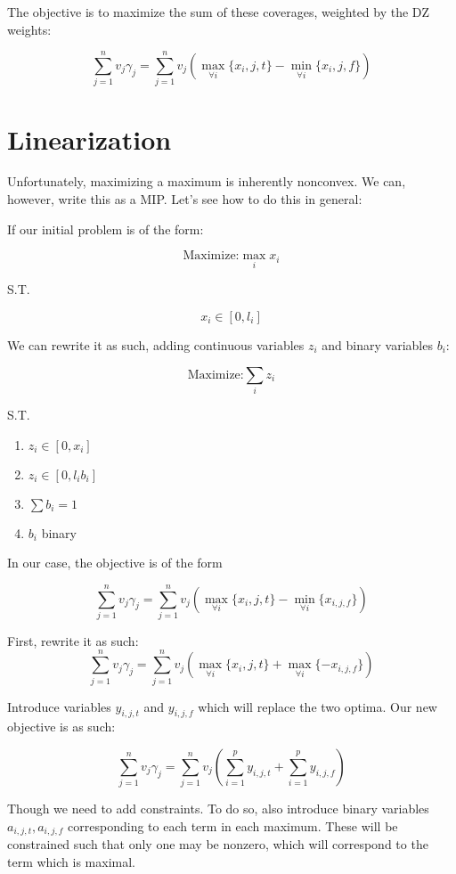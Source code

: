 \documentclass[a4paper]{article}
\begin{document}
The objective is to maximize the sum of these coverages, weighted by the DZ weights:

$$
\sum_{j=1}^n v_j \gamma_j = \sum_{j=1}^n v_j(\max_{\forall i}\{x_i,j,t\} - \min_{\forall i}\{x_i,j,f\})
$$

\section{Linearization}

Unfortunately, maximizing a maximum is inherently nonconvex. We can, however, write this as a MIP. Let's see how to do this in general:

If our initial problem is of the form:

$$
\textrm{Maximize:} \max_{i} x_i
$$

S.T.

$$
x_i \in [0, l_i]
$$

We can rewrite it as such, adding continuous variables $z_i$ and binary variables $b_i$:

$$
\textrm{Maximize:} \sum_{i} z_i
$$

S.T.

\begin{enumerate}
    \item $z_i \in [0, x_i]$
    \item $z_i \in [0, l_i b_i]$
    \item $\sum b_i = 1$
    \item $b_i$ binary
\end{enumerate}

In our case, the objective is of the form 

$$
\sum_{j=1}^n v_j \gamma_j = \sum_{j=1}^n v_j(\max_{\forall i}\{x_i,j,t\} - \min_{\forall i}\{x_{i,j,f}\})
$$

First, rewrite it as such:
$$
\sum_{j=1}^n v_j \gamma_j = \sum_{j=1}^n v_j(\max_{\forall i}\{x_i,j,t\} + \max_{\forall i}\{-x_{i,j,f}\})
$$

Introduce variables $y_{i,j,t}$ and $y_{i,j,f}$ which will replace the two optima. Our new objective is as such:

$$
\sum_{j=1}^n v_j \gamma_j = \sum_{j=1}^n v_j(\sum_{i=1}^p y_{i,j,t} + \sum_{i=1}^p y_{i,j,f})
$$

Though we need to add constraints. To do so, also introduce binary variables $a_{i,j,t}, a_{i,j,f}$ corresponding to each term in each maximum. These will be constrained such that only one may be nonzero, which will correspond to the term which is maximal.
\end{document}
